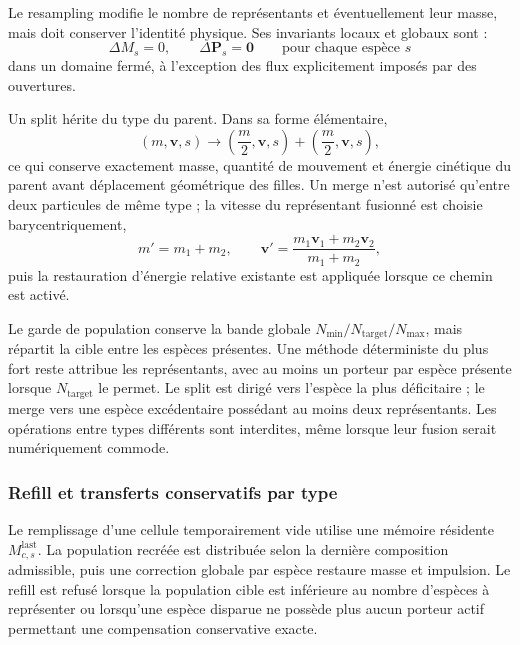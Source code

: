 \documentclass[11pt,a4paper]{article}
\begin{document}
Le resampling modifie le nombre de représentants et éventuellement leur masse, mais doit conserver l'identité physique. Ses invariants locaux et globaux sont :
\begin{equation}
  \Delta M_s=0,
  \qquad \Delta\bm{P}_s=\bm{0}
  \qquad \text{pour chaque espèce }s
\end{equation}
dans un domaine fermé, à l'exception des flux explicitement imposés par des ouvertures.

Un split hérite du type du parent. Dans sa forme élémentaire,
\begin{equation}
  (m,\bm{v},s)
  \longrightarrow
  \left(\frac{m}{2},\bm{v},s\right)
  +\left(\frac{m}{2},\bm{v},s\right),
\end{equation}
ce qui conserve exactement masse, quantité de mouvement et énergie cinétique du parent avant déplacement géométrique des filles. Un merge n'est autorisé qu'entre deux particules de même type ; la vitesse du représentant fusionné est choisie barycentriquement,
\begin{equation}
  m'=m_1+m_2,
  \qquad
  \bm{v}'=\frac{m_1\bm{v}_1+m_2\bm{v}_2}{m_1+m_2},
\end{equation}
puis la restauration d'énergie relative existante est appliquée lorsque ce chemin est activé.

Le garde de population conserve la bande globale $N_{\min}/N_{\mathrm{target}}/N_{\max}$, mais répartit la cible entre les espèces présentes. Une méthode déterministe du plus fort reste attribue les représentants, avec au moins un porteur par espèce présente lorsque $N_{\mathrm{target}}$ le permet. Le split est dirigé vers l'espèce la plus déficitaire ; le merge vers une espèce excédentaire possédant au moins deux représentants. Les opérations entre types différents sont interdites, même lorsque leur fusion serait numériquement commode.

\subsubsection{Refill et transferts conservatifs par type}

Le remplissage d'une cellule temporairement vide utilise une mémoire résidente $M^{\mathrm{last}}_{c,s}$. La population recréée est distribuée selon la dernière composition admissible, puis une correction globale par espèce restaure masse et impulsion. Le refill est refusé lorsque la population cible est inférieure au nombre d'espèces à représenter ou lorsqu'une espèce disparue ne possède plus aucun porteur actif permettant une compensation conservative exacte.
\end{document}
